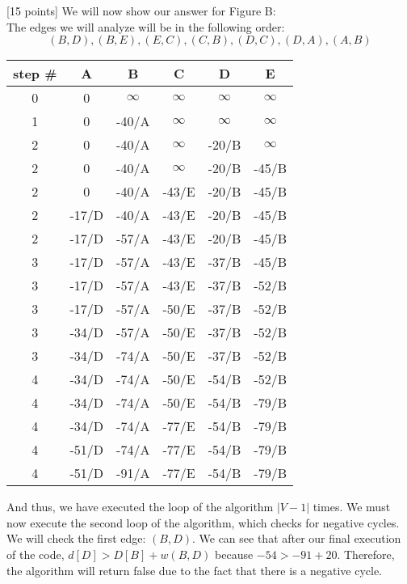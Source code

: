 \documentclass[12pt]{article}
\newcounter{ques}
\newenvironment{question}{\stepcounter{ques}{\noindent\bf Question \arabic{ques}:}}{\vspace{5mm}}
\begin{document}
\begin{question}[15 points]
We will now show our answer for Figure B:\\
The edges we will analyze will be in the following order:
$$(B, D), (B, E), (E, C), (C, B), (D, C), (D, A), (A, B)$$
\begin{center}
  \begin{tabular}{||c | c c c c c||}
   \hline
    step \# & A & B & C & D & E \\ [0.5ex]
   \hline\hline
   0 & 0 & $\infty$ & $\infty$ & $\infty$ & $\infty$\\
   \hline
   1 & 0 & -40/A & $\infty$ & $\infty$ & $\infty$\\
   \hline
   2 & 0 & -40/A & $\infty$ & -20/B & $\infty$\\
   2 & 0 & -40/A & $\infty$ & -20/B & -45/B\\
   2 & 0 & -40/A & -43/E & -20/B & -45/B\\
   2 & -17/D & -40/A & -43/E & -20/B & -45/B\\
   2 & -17/D & -57/A & -43/E & -20/B & -45/B\\
   \hline
   3 & -17/D & -57/A & -43/E & -37/B & -45/B\\
   3 & -17/D & -57/A & -43/E & -37/B & -52/B\\
   3 & -17/D & -57/A & -50/E & -37/B & -52/B\\
   3 & -34/D & -57/A & -50/E & -37/B & -52/B\\
   3 & -34/D & -74/A & -50/E & -37/B & -52/B\\
   \hline
   4 & -34/D & -74/A & -50/E & -54/B & -52/B\\
   4 & -34/D & -74/A & -50/E & -54/B & -79/B\\
   4 & -34/D & -74/A & -77/E & -54/B & -79/B\\
   4 & -51/D & -74/A & -77/E & -54/B & -79/B\\
   4 & -51/D & -91/A & -77/E & -54/B & -79/B\\
   \hline
  \end{tabular}
\end{center}
And thus, we have executed the loop of the algorithm  $|V-1|$ times. We must now execute the second loop of the algorithm, which checks for negative cycles.
We will check the first edge: $(B,D)$.
We can see that after our final execution of the code, $d[D] > D[B] + w(B,D)$ because $-54 > -91 + 20$. Therefore, the algorithm will return false due to the fact that there is a negative cycle.

\end{question}
\end{document}
